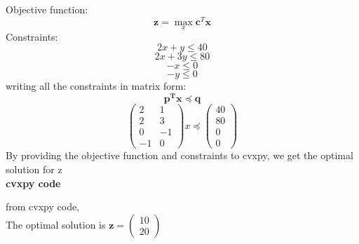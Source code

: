 \documentclass[10pt, a4paper]{article}
\newcommand{\myvec}[1]{\ensuremath{\begin{pmatrix}#1\end{pmatrix}}}
\let\vec\mathbf
\begin{document}
Objective function:
\begin{equation}
 \vec{z} = \max_{x}\vec{c}^T\vec{x}
\end{equation}
Constraints:
\begin{equation}
2x + y\le 40
\end{equation}
\begin{equation}
2x + 3y \le 80
\end{equation}
\begin{equation}
-x \le 0
\end{equation}
\begin{equation}
-y \le 0
\end{equation}
writing all the constraints in matrix form:
\begin{equation}
\vec{p^T}\vec{x} \preceq \vec{q}
\end{equation}
\begin{equation}
\myvec{2&1 \\2&3 \\ 0&-1 \\ -1&0}x \preceq \myvec{40 \\ 80 \\ 0 \\ 0 }
\end{equation}
By providing the objective function and constraints to cvxpy, we get the optimal solution for z
\\
\textbf{cvxpy code}

from cvxpy code,\\
The optimal solution is $\vec{z} = \myvec{10 \\ 20}$
\end{document}
